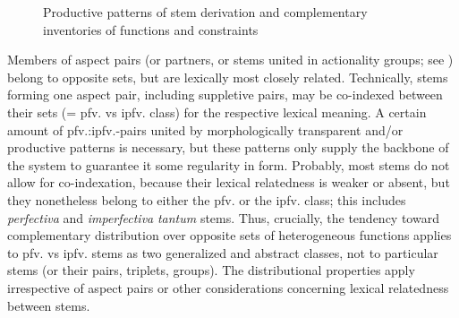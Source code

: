 \documentclass[output=paper]{langscibook}
\begin{document}
\begin{figure}

\caption{Productive patterns of stem derivation and complementary inventories of functions and constraints\label{fig:wiemer:3}}
\end{figure}


Members of aspect pairs (or partners, or stems united in actionality groups; see ) belong to opposite sets, but are lexically most closely related. Technically, stems forming one aspect pair, including suppletive pairs, may be co-indexed between their sets (= pfv. vs ipfv. class) for the respective lexical meaning. A certain amount of pfv.:ipfv.-pairs united by morphologically transparent and/or productive patterns is necessary, but these patterns only supply the backbone of the system to guarantee it some regularity in form. Probably, most stems do not allow for co-indexation, because their lexical relatedness is weaker or absent, but they nonetheless belong to either the pfv. or the ipfv. class; this includes \textit{perfectiva} and \textit{imperfectiva} \textit{tantum} stems. Thus, crucially, the tendency toward complementary distribution over opposite sets of heterogeneous functions applies to pfv. vs ipfv. stems as two generalized and abstract classes, not to particular stems (or their pairs, triplets, groups). The distributional properties apply irrespective of aspect pairs or other considerations concerning lexical relatedness between stems.
\end{document}
